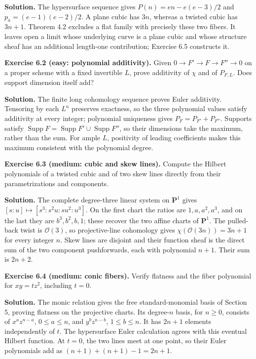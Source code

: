 \documentclass[11pt]{article}
\begin{document}
\textbf{Solution.} The hypersurface sequence gives \(P(n)=en-e(e-3)/2\)
and \(p_a=(e-1)(e-2)/2\). A plane cubic has \(3n\), whereas a twisted
cubic has \(3n+1\). Theorem 4.2 excludes a flat family with precisely
these two fibers. It leaves open a limit whose underlying curve is a
plane cubic and whose structure sheaf has an additional length-one
contribution; Exercise 6.5 constructs it.

\textbf{Exercise 6.2 (easy: polynomial additivity).} Given
\(0\to F'\to F\to F''\to0\) on a proper scheme with a fixed invertible
\(L\), prove additivity of \(\chi\) and of \(P_{F,L}\). Does support
dimension itself add?

\textbf{Solution.} The finite long cohomology sequence proves Euler
additivity. Tensoring by each \(L^n\) preserves exactness, so the three
polynomial values satisfy additivity at every integer; polynomial
uniqueness gives \(P_F=P_{F'}+P_{F''}\). Supports satisfy
\(\operatorname{Supp}F=\operatorname{Supp}F'\cup\operatorname{Supp}F''\),
so their dimensions take the maximum, rather than the sum. For ample
\(L\), positivity of leading coefficients makes this maximum consistent
with the polynomial degree.

\textbf{Exercise 6.3 (medium: cubic and skew lines).} Compute the
Hilbert polynomials of a twisted cubic and of two skew lines directly
from their parametrizations and components.

\textbf{Solution.} The complete degree-three linear system on
\(\mathbf P^1\) gives \([s:u]\mapsto[s^3:s^2u:su^2:u^3]\). On the first
chart the ratios are \(1,a,a^2,a^3\), and on the last they are
\(b^3,b^2,b,1\); these recover the two affine charts of \(\mathbf P^1\).
The pulled-back twist is \(\mathcal O(3)\), so projective-line
cohomology gives \(\chi(\mathcal O(3n))=3n+1\) for every integer \(n\).
Skew lines are disjoint and their function sheaf is the direct sum of
the two component pushforwards, each with polynomial \(n+1\). Their sum
is \(2n+2\).

\textbf{Exercise 6.4 (medium: conic fibers).} Verify flatness and the
fiber polynomial for \(xy=tz^2\), including \(t=0\).

\textbf{Solution.} The monic relation gives the free standard-monomial
basis of Section 5, proving flatness on the projective charts. Its
degree-\(n\) basis, for \(n\geq0\), consists of \(x^az^{n-a}\),
\(0\leq a\leq n\), and \(y^bz^{n-b}\), \(1\leq b\leq n\). It has
\(2n+1\) elements independently of \(t\). The hypersurface Euler
calculation agrees with this eventual Hilbert function. At \(t=0\), the
two lines meet at one point, so their Euler polynomials add as
\((n+1)+(n+1)-1=2n+1\).
\end{document}
